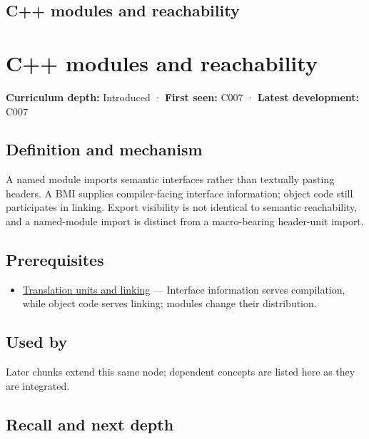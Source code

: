 \hypertarget{appendix-410a611a5b8d}{}
\section*{C++ modules and reachability}
\chapter{C++ modules and reachability}\label{appendix-410a611a5b8d-c-modules-and-reachability}

\textbf{Curriculum depth:} Introduced · \textbf{First seen:} C007 · \textbf{Latest development:} C007

\section{Definition and mechanism}\label{appendix-410a611a5b8d-definition-and-mechanism}

A named module imports semantic interfaces rather than textually pasting headers. A BMI supplies compiler-facing interface information; object code still participates in linking. Export visibility is not identical to semantic reachability, and a named-module import is distinct from a macro-bearing header-unit import.

\section{Prerequisites}\label{appendix-410a611a5b8d-prerequisites}

\begin{itemize}
\tightlist
\item
  \hyperref[appendix-806686359e1b]{Translation units and linking} --- Interface information serves compilation, while object code serves linking; modules change their distribution.
\end{itemize}

\section{Used by}\label{appendix-410a611a5b8d-used-by}

Later chunks extend this same node; dependent concepts are listed here as they are integrated.

\section{Recall and next depth}\label{appendix-410a611a5b8d-recall-and-next-depth}

